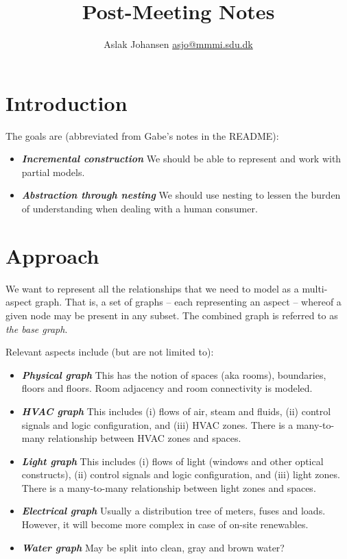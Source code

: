 \documentclass{article}
\title{Post-Meeting Notes\\\scalebox{.85}{from 23rd Mar, 2016}}
\author{Aslak Johansen \href{mailto:asjo@mmmi.sdu.dk}{asjo@mmmi.sdu.dk}}
\newcommand{\textdesc}[1]{\textit{\textbf{#1}}}
\newcommand{\descitem}[1]{\item \textdesc{#1}}
\begin{document}
\maketitle
\tableofcontents

\section{Introduction}

The goals are (abbreviated from Gabe's notes in the README):
\begin{itemize}
  \descitem{Incremental construction} We should be able to represent and work with partial models.
  \descitem{Abstraction through nesting} We should use nesting to lessen the burden of understanding when dealing with a human consumer.
\end{itemize}

\section{Approach}

\nocite{nederveen1992}

We want to represent all the relationships that we need to model as a multi-aspect graph. That is, a set of graphs -- each representing an aspect -- whereof a given node may be present in any subset. The combined graph is referred to as \textsl{the base graph}.

Relevant aspects include (but are not limited to):
\begin{itemize}
  \descitem{Physical graph} This has the notion of spaces (aka rooms), boundaries, floors and floors. Room adjacency and room connectivity is modeled.
  \descitem{HVAC graph} This includes (i) flows of air, steam and fluids, (ii) control signals and logic configuration, and (iii) HVAC zones. There is a many-to-many relationship between HVAC zones and spaces.
  \descitem{Light graph} This includes (i) flows of light (windows and other optical constructs), (ii) control signals and logic configuration, and (iii) light zones. There is a many-to-many relationship between light zones and spaces.
  \descitem{Electrical graph} Usually a distribution tree of meters, fuses and loads. However, it will become more complex in case of on-site renewables.
  \descitem{Water graph} May be split into clean, gray and brown water?
\end{itemize}
\end{document}
